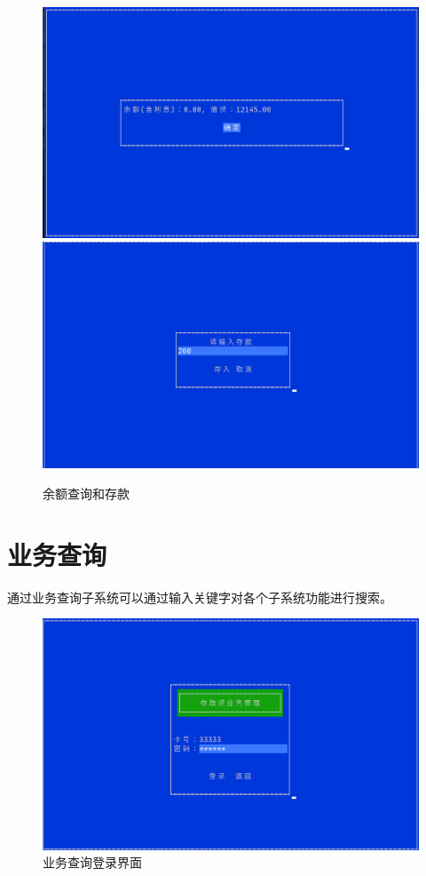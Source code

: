 \documentclass{ctexrep}
\begin{document}
\begin{figure}[H]
  \centering\includegraphics[scale=0.38]{preview_blance.png}
  \includegraphics[scale=0.38]{preview_store.png}
  \caption{余额查询和存款}
\end{figure}
\section{业务查询}
通过业务查询子系统可以通过输入关键字对各个子系统功能进行搜索。

\begin{figure}[H]
  \centering\includegraphics[scale=0.45]{preview_transaction_login.png}
  \caption{业务查询登录界面}
\end{figure}
\end{document}
